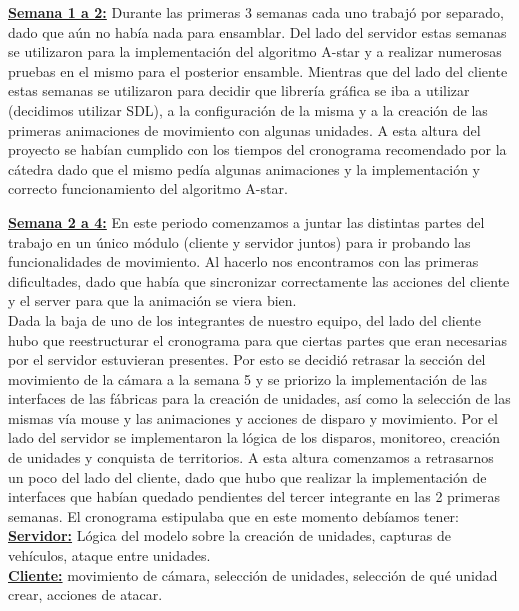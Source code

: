 \hfill \break
\underline{\textbf{Semana 1 a 2:}}
Durante las primeras 3 semanas cada uno trabajó por separado,
dado que aún no había nada para ensamblar. Del lado del servidor estas semanas
se utilizaron para la implementación del algoritmo A-star y a realizar numerosas
pruebas en el mismo para el posterior ensamble. Mientras que del lado del cliente
estas semanas se utilizaron para decidir que librería gráfica se iba a utilizar
(decidimos utilizar SDL), a la configuración de la misma y a la creación de las
primeras animaciones de movimiento con algunas unidades.
A esta altura del proyecto se habían cumplido con los tiempos del cronograma
recomendado por la cátedra dado que el mismo pedía algunas animaciones y la
implementación y correcto funcionamiento del algoritmo A-star.

\hfill \break
\underline{\textbf{Semana 2 a 4:}}
En este periodo comenzamos a juntar las distintas partes del trabajo
en un único módulo (cliente y servidor juntos) para ir probando las
funcionalidades de movimiento. Al hacerlo nos encontramos con las primeras
dificultades, dado que había que sincronizar correctamente las acciones del
cliente y el server para que la animación se viera bien. \\
Dada la baja de uno de los integrantes de nuestro equipo, del lado del cliente
hubo que reestructurar el cronograma para que ciertas partes que eran necesarias
por el servidor estuvieran presentes. Por esto se decidió retrasar la sección
del movimiento de la cámara a la semana 5 y se priorizo la implementación de las
interfaces de las fábricas para la creación de unidades, así como la selección
de las mismas vía mouse y las animaciones y acciones de disparo y movimiento.
Por el lado del servidor se implementaron la lógica de los disparos, monitoreo,
creación de unidades y conquista de territorios. A esta altura comenzamos a
retrasarnos un poco del lado del cliente, dado que hubo que realizar la
implementación de interfaces que habían quedado pendientes del tercer integrante
en las 2 primeras semanas. El cronograma estipulaba que en este momento
debíamos tener: \\

\underline{\textbf{Servidor:}} Lógica del modelo sobre la creación de unidades,
capturas de vehículos, ataque entre unidades.\\

\underline{\textbf{Cliente:}} movimiento de cámara, selección de unidades,
selección de qué unidad crear, acciones de atacar. \\

